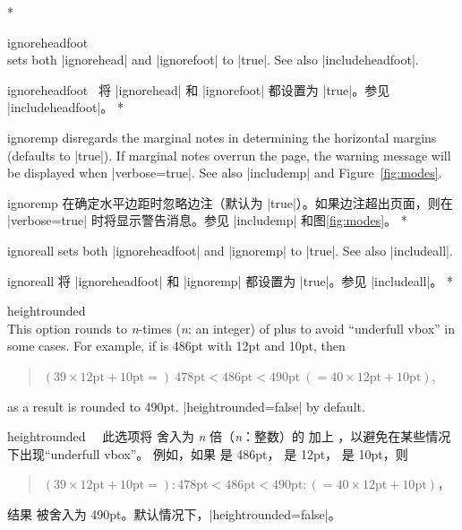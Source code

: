 \begin{Options}
\begin{paracol}{2}
\switchcolumn[0]*
\item[ignoreheadfoot]~\\ sets both |ignorehead| and |ignorefoot|
   to |true|. See also |includeheadfoot|.
   \switchcolumn
   \item[ignoreheadfoot] \ 将 |ignorehead| 和 |ignorefoot| 都设置为 |true|。参见 |includeheadfoot|。
\switchcolumn[0]*
\item[ignoremp] disregards the marginal notes in determining the
   horizontal margins (defaults to |true|). If marginal notes overrun
   the page, the warning message will be displayed when |verbose=true|.
   See also |includemp| and Figure~\ref{fig:modes}.
   \switchcolumn
   \item[ignoremp] 在确定水平边距时忽略边注（默认为 |true|）。如果边注超出页面，则在 |verbose=true| 时将显示警告消息。参见 |includemp| 和图\ref{fig:modes}。
\switchcolumn[0]*
\item[ignoreall] sets both |ignoreheadfoot| and |ignoremp| to |true|. 
   See also |includeall|.
   \switchcolumn
   \item[ignoreall] 将 |ignoreheadfoot| 和 |ignoremp| 都设置为 |true|。参见 |includeall|。
\switchcolumn[0]*
\item[heightrounded]~\\
   This option rounds  to \textit{n}-times (\textit{n}:
   an integer) of  plus  to avoid 
   ``underfull vbox'' in some cases. For example, if  is
   486pt with  12pt and  10pt, then
   \begin{quote}
     $(39\times12\textrm{pt}+10\textrm{pt}=)\: 478\textrm{pt}
      < 486\textrm{pt} < 
     490\textrm{pt} \:(=40\times12\textrm{pt}+10\textrm{pt})$,
   \end{quote}
   as a result  is rounded to 490pt. |heightrounded=false|
   by default.
   \switchcolumn
   \item[heightrounded] ~\
此选项将  舍入为 \textit{n} 倍（\textit{n}：整数）的  加上 ，以避免在某些情况下出现``underfull vbox''。
例如，如果 \cs{textheight} 是 486pt，\cs{baselineskip} 是 12pt，\cs{topskip} 是 10pt，则
\begin{quote}
$(39\times12\textrm{pt}+10\textrm{pt}=): 478\textrm{pt}
< 486\textrm{pt} <
490\textrm{pt} :(=40\times12\textrm{pt}+10\textrm{pt})$，
\end{quote}
结果  被舍入为 490pt。默认情况下，|heightrounded=false|。
\end{paracol}
\end{Options}


